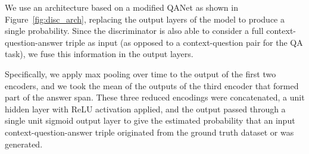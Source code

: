 \documentclass[11pt,a4paper]{article}
\begin{document}
We use an architecture based on a modified QANet as shown in Figure~\ref{fig:disc_arch}, replacing the output layers of the model to produce a single probability. Since the discriminator is also able to consider a full context-question-answer triple as input (as opposed to a context-question pair for the QA task), we fuse this information in the output layers.

Specifically, we apply max pooling over time to the output of the first two encoders, and we took the mean of the outputs of the third encoder that formed part of the answer span. These three reduced encodings were concatenated, a  unit hidden layer with ReLU activation applied, and the output passed through a single unit sigmoid output layer to give the estimated probability that an input context-question-answer triple originated from the ground truth dataset or was generated.
\end{document}
